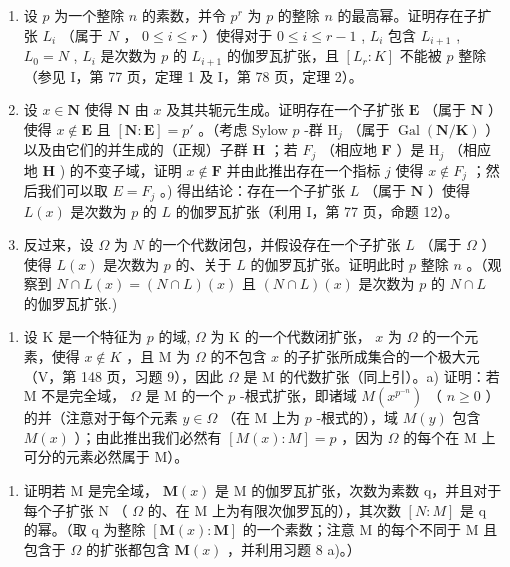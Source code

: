 \begin{enumerate}
\def\labelenumi{\alph{enumi})}
\item
  设 \(p\) 为一个整除 \(n\) 的素数，并令 \(p^r\) 为 \(p\) 的整除 \(n\) 的最高幂。证明存在子扩张 \(L_i\) （属于 \(N\) ， \(0 \leqslant i \leqslant r\) ）使得对于 \(0 \leqslant i \leqslant r - 1\) , \(L_i\) 包含 \(L_{i+1}\) , \(L_0 = N\) , \(L_i\) 是次数为 \(p\) 的 \(L_{i+1}\) 的伽罗瓦扩张，且 \([L_r: K]\) 不能被 \(p\) 整除（参见 I，第 77 页，定理 1 及 I，第 78 页，定理 2）。
\item
  设 \(x \in \mathbf{N}\) 使得 \(\mathbf{N}\) 由 \(x\) 及其共轭元生成。证明存在一个子扩张 \(\mathbf{E}\) （属于 \(\mathbf{N}\) ）使得 \(x \notin \mathbf{E}\) 且 \([\mathbf{N} : \mathbf{E}] = p'\) 。（考虑 Sylow \(p\) -群 \(\mathrm{H}_j\) （属于 \(\operatorname{Gal}(\mathbf{N} / \mathbf{K})\) ）以及由它们的并生成的（正规）子群 \(\mathbf{H}\) ；若 \(F_j\) （相应地 \(\mathbf{F}\) ）是 \(\mathrm{H}_j\) （相应地 \(\mathbf{H}\) ) 的不变子域，证明 \(x \notin \mathbf{F}\) 并由此推出存在一个指标 \(j\) 使得 \(x \notin F_j\) ；然后我们可以取 \(E = F_{j}\) 。) 得出结论：存在一个子扩张 \(L\) （属于 \(\mathbf{N}\) ）使得 \(L(x)\) 是次数为 \(p\) 的 \(L\) 的伽罗瓦扩张（利用 I，第 77 页，命题 12）。
\item
  反过来，设 \(\Omega\) 为 \(N\) 的一个代数闭包，并假设存在一个子扩张 \(L\) （属于 \(\Omega\) ）使得 \(L(x)\) 是次数为 \(p\) 的、关于 \(L\) 的伽罗瓦扩张。证明此时 \(p\) 整除 \(n\) 。（观察到 \(N \cap L(x) = (N \cap L)(x)\) 且 \((N \cap L)(x)\) 是次数为 \(p\) 的 \(N \cap L\) 的伽罗瓦扩张.)
\end{enumerate}

\begin{enumerate}
\def\labelenumi{\arabic{enumi})}
\setcounter{enumi}{8}
\tightlist
\item
  设 K 是一个特征为 \(p\) 的域, \(\Omega\) 为 K 的一个代数闭扩张， \(x\) 为 \(\Omega\) 的一个元素，使得 \(x \notin K\) ，且 M 为 \(\Omega\) 的不包含 \(x\) 的子扩张所成集合的一个极大元（V，第 148 页，习题 9），因此 \(\Omega\) 是 M 的代数扩张（同上引）。a) 证明：若 M 不是完全域， \(\Omega\) 是 M 的一个 \(p\) -根式扩张，即诸域 \(M(x^{p^{-n}})\) （ \(n \geqslant 0\) ）的并（注意对于每个元素 \(y \in \Omega\) （在 M 上为 \(p\) -根式的），域 \(M(y)\) 包含 \(M(x)\) ）；由此推出我们必然有 \([M(x):M] = p\) ，因为 \(\Omega\) 的每个在 M 上可分的元素必然属于 M）。
\end{enumerate}

\begin{enumerate}
\def\labelenumi{\alph{enumi})}
\setcounter{enumi}{1}
\tightlist
\item
  证明若 M 是完全域， \(\mathbf{M}(x)\) 是 M 的伽罗瓦扩张，次数为素数 q，并且对于每个子扩张 N （ \(\Omega\) 的、在 M 上为有限次伽罗瓦的），其次数 \([N:M]\) 是 q 的幂。（取 q 为整除 \([\mathbf{M}(x):\mathbf{M}]\) 的一个素数；注意 M 的每个不同于 M 且包含于 \(\Omega\) 的扩张都包含 \(\mathbf{M}(x)\) ，并利用习题 8 a)。）
\end{enumerate}

